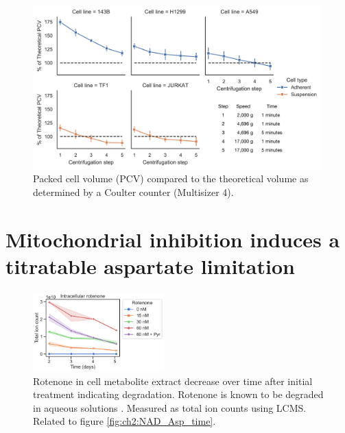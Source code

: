 \begin{figure}[ht]
    \centering
    \includegraphics[width=0.99\textwidth]{figures/chap2/app/CCvsPCV.pdf}
    \caption[Packed cell volume vs. Coulter counter]{
    Packed cell volume (PCV) compared to the theoretical volume as determined by a Coulter counter (Multisizer 4).
    }
    \label{fig:app_ch2:CCvsPCV}
\end{figure}




\newpage
\section{Mitochondrial inhibition induces a titratable aspartate limitation}
\begin{figure}[ht]
    \centering
    \includegraphics[width=0.45\textwidth]{figures/chap2/app/intra-rotenone-time_rep1.pdf}
    \caption[Rotenone concentration over time.]{
    Rotenone in cell metabolite extract decrease over time after initial treatment indicating degradation.
    Rotenone is known to be degraded in aqueous solutions \cite{Rohan2015-co}.
    Measured as total ion counts using LCMS.
    Related to figure \ref{fig:ch2:NAD_Asp_time}.
    }
    \label{fig:ch2:app:Rot_by_day}
\end{figure}

